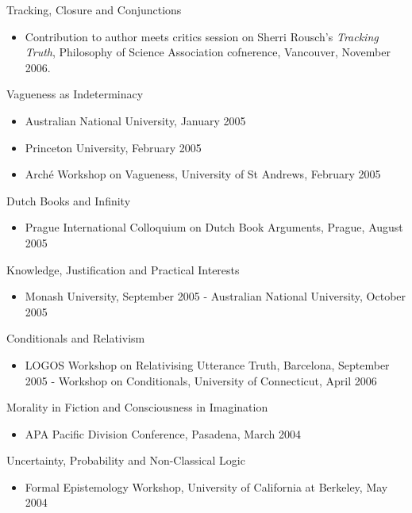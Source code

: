 \documentclass[
  10pt,
  letterpaper,
  DIV=11,
  numbers=noendperiod,
  twoside]{scrartcl}
\providecommand{\tightlist}{%
  \setlength{\itemsep}{0pt}\setlength{\parskip}{0pt}}
\begin{document}
Tracking, Closure and Conjunctions

\begin{itemize}
\tightlist
\item
  Contribution to author meets critics session on Sherri Rousch's
  \emph{Tracking Truth}, Philosophy of Science Association cofnerence,
  Vancouver, November 2006.
\end{itemize}

Vagueness as Indeterminacy

\begin{itemize}
\tightlist
\item
  Australian National University, January 2005
\item
  Princeton University, February 2005
\item
  Arché Workshop on Vagueness, University of St Andrews, February 2005
\end{itemize}

Dutch Books and Infinity

\begin{itemize}
\tightlist
\item
  Prague International Colloquium on Dutch Book Arguments, Prague,
  August 2005
\end{itemize}

Knowledge, Justification and Practical Interests

\begin{itemize}
\tightlist
\item
  Monash University, September 2005 - Australian National University,
  October 2005
\end{itemize}

Conditionals and Relativism

\begin{itemize}
\tightlist
\item
  LOGOS Workshop on Relativising Utterance Truth, Barcelona, September
  2005 - Workshop on Conditionals, University of Connecticut, April 2006
\end{itemize}

Morality in Fiction and Consciousness in Imagination

\begin{itemize}
\tightlist
\item
  APA Pacific Division Conference, Pasadena, March 2004
\end{itemize}

Uncertainty, Probability and Non-Classical Logic

\begin{itemize}
\tightlist
\item
  Formal Epistemology Workshop, University of California at Berkeley,
  May 2004
\end{itemize}
\end{document}
